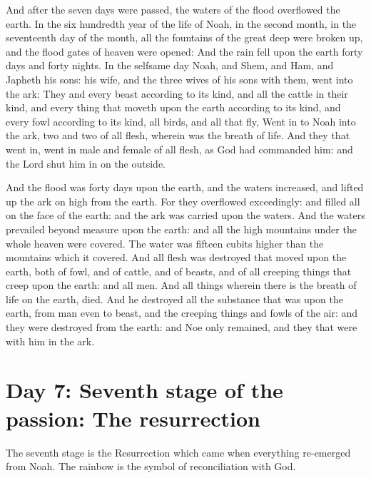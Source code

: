 And after the seven days were passed, the waters of the flood overflowed the earth. In the six hundredth year of the life of Noah, in the second month, in the seventeenth day of the month, all the fountains of the great deep were broken up, and the flood gates of heaven were opened: And the rain fell upon the earth forty days and forty nights. In the selfsame day Noah, and Shem, and Ham, and Japheth his sons: his wife, and the three wives of his sons with them, went into the ark: They and every beast according to its kind, and all the cattle in their kind, and every thing that moveth upon the earth according to its kind, and every fowl according to its kind, all birds, and all that fly, Went in to Noah into the ark, two and two of all flesh, wherein was the breath of life. And they that went in, went in male and female of all flesh, as God had commanded him: and the Lord shut him in on the outside.

And the flood was forty days upon the earth, and the waters increased, and lifted up the ark on high from the earth. For they overflowed exceedingly: and filled all on the face of the earth: and the ark was carried upon the waters. And the waters prevailed beyond measure upon the earth: and all the high mountains under the whole heaven were covered. The water was fifteen cubits higher than the mountains which it covered. And all flesh was destroyed that moved upon the earth, both of fowl, and of cattle, and of beasts, and of all creeping things that creep upon the earth: and all men. And all things wherein there is the breath of life on the earth, died. And he destroyed all the substance that was upon the earth, from man even to beast, and the creeping things and fowls of the air: and they were destroyed from the earth: and Noe only remained, and they that were with him in the ark.

\section{Day 7: Seventh stage of the passion: The resurrection}

The seventh stage is the Resurrection which came when everything re-emerged from Noah. The rainbow is the symbol of reconciliation with God.

